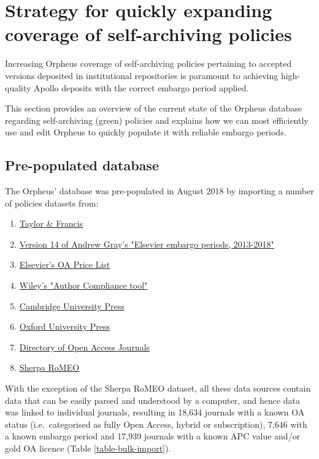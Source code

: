 \documentclass[british, 12pt]{article}
\begin{document}
\section{Strategy for quickly expanding coverage of self-archiving policies}

Increasing Orpheus coverage of self-archiving policies pertaining to accepted versions deposited in institutional repositories is paramount to achieving high-quality Apollo deposits with the correct embargo period applied.

This section provides an overview of the current state of the Orpheus database regarding self-archiving (green) policies and explains how we can most efficiently use and edit Orpheus to quickly populate it with reliable embargo periods.

\subsection{Pre-populated database}
\label{section-bulk-import}

The Orpheus' database was pre-populated in August 2018 by importing a number of policies datasets from:

\begin{enumerate}
 \item \href{https://authorservices.taylorandfrancis.com/journal-list/#}{Taylor \& Francis}
 \item \href{https://doi.org/10.6084/m9.figshare.1554748.v14}{Version 14 of Andrew Gray's "Elsevier embargo periods, 2013-2018"}
 \item \href{https://www.elsevier.com/__data/promis_misc/j.custom97.pdf}{Elsevier's OA Price List}
 \item \href{https://authorservices.wiley.com/author-resources/Journal-Authors/open-access/author-compliance-tool.html}{Wiley's "Author Compliance tool"}
 \item \href{https://www.cambridge.org/core/services/aop-file-manager/file/5783738dbd8dfd4e3283c3f2}{Cambridge University Press}
 \item \href{https://academic.oup.com/journals/pages/access_purchase/rights_and_permissions/embargo_periods}{Oxford University Press}
 \item \href{https://doaj.org/}{Directory of Open Access Journals}
 \item \href{http://www.sherpa.ac.uk/romeo/index.php}{Sherpa RoMEO}
\end{enumerate}

With the exception of the Sherpa RoMEO dataset, all these data sources contain data that can be easily parsed and understood by a computer, and hence data was linked to individual journals, resulting in 18,634 journals with a known OA status (i.e.\ categorised as fully Open Access, hybrid or subscription), 7,646 with a known embargo period and 17,939 journals with a known APC value and/or gold OA licence (Table \vref{table-bulk-import}).
\end{document}
